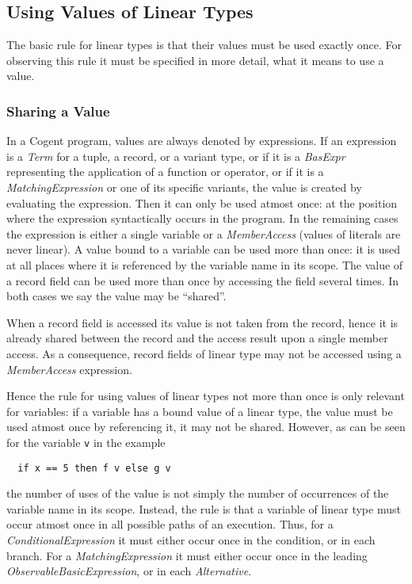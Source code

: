 \documentclass[a4paper]{report}
\newcommand{\code}[1]{\textnormal{\texttt{#1}}}
\newcommand{\cogent}{Cogent\xspace}
\begin{document}
\subsection{Using Values of Linear Types}

The basic rule for linear types is that their values must be used exactly once. For observing this rule it must 
be specified in more detail, what it means to use a value.

\subsubsection{Sharing a Value}

In a \cogent program, values are always denoted by expressions. If an expression is a \textit{Term} for a tuple, a record,
or a variant type, or if it is a \textit{BasExpr} representing the application of a function or operator, or if it is
a \textit{MatchingExpression} or one of its specific variants, the value is created by evaluating the expression. Then
it can only be used atmost once: at the position where the expression syntactically occurs in the program. In the remaining
cases the expression is either a single variable or a \textit{MemberAccess} (values of literals are never linear). 
A value 
bound to a variable can be used more than once: it is used at all places where it is referenced by
the variable name in its scope. The value of a record field can be used more than once by accessing the field
several times. In both cases we say the value may be ``shared''.

When a record field is accessed its value is not taken from the record, hence it is already shared between the record
and the access result upon a single member access. As a consequence, record fields of linear type may not be accessed
using a \textit{MemberAccess} expression.

Hence the rule for using values of linear types not more than once is only relevant for variables: 
if a variable has a 
bound value of a linear type, the value must be used atmost once by referencing it, it may not be shared. However, 
as can be seen for the variable \code{v} in the example
\begin{verbatim}
  if x == 5 then f v else g v
\end{verbatim}
the number of uses of the value is not simply the number of occurrences of the variable name in its scope.  Instead,
the rule is that a variable of linear type must occur atmost once in all possible paths of an execution. Thus,
for a \textit{ConditionalExpression} it must either occur once in the condition, or in each branch. For
a \textit{MatchingExpression} it must either occur once in the leading 
\textit{ObservableBasicExpression}, or in each \textit{Alternative}.
\end{document}
